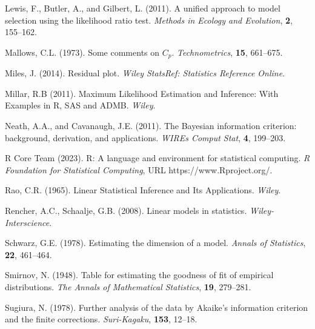 \phantom{a}

\rff Lewis, F., Butler, A., and Gilbert, L. (2011).
      A unified approach to model selection using the likelihood ratio test.
      {\it Methods in Ecology and Evolution},
      {\bf 2}, {155--162}.

\phantom{a}

\rff Mallows, C.L. (1973).
      Some comments on $C_p$.
      {\it Technometrics},
      {\bf 15}, {661--675}.

\phantom{a}

\rff Miles, J. (2014).
      Residual plot.
      {\it Wiley StatsRef: Statistics Reference Online}.      

\phantom{a}

\rff Millar, R.B (2011).
      Maximum Likelihood Estimation and Inference: With Examples in R, SAS and ADMB.
      {\it Wiley}.      

\phantom{a}

\rff Neath, A.A., and Cavanaugh, J.E. (2011).
      The Bayesian information criterion: background, derivation, and applications.
      {\it WIREs Comput Stat},
      {\bf 4}, {199--203}.
      
\phantom{a}

\rff R Core Team (2023).
      R: A language and environment for statistical computing.
      {\it R Foundation for Statistical Computing},
      URL https://www.Rproject.org/.

\phantom{a}

\rff Rao, C.R. (1965).
      Linear Statistical Inference and Its Applications.
      {\it Wiley}.

\phantom{a}

\rff Rencher, A.C., Schaalje, G.B. (2008).
      Linear models in statistics.
      {\it Wiley-Interscience}.

\phantom{a}

\rff Schwarz, G.E. (1978).
      Estimating the dimension of a model.
      {\it Annals of Statistics},
      {\bf 22}, {461--464}.

\phantom{a}

\rff Smirnov, N. (1948).
    Table for estimating the goodness of fit of empirical distributions.
    {\it The Annals of Mathematical Statistics},
    {\bf 19}, {279--281}.

\phantom{a}

\rff Sugiura, N. (1978).
      Further analysis of the data by Akaike's information criterion and the finite corrections.
      {\it Suri-Kagaku},
      {\bf 153}, {12--18}.

